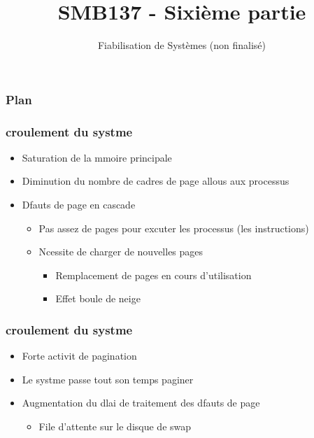 

\title{SMB137 - Sixième partie}
\subtitle{Fiabilisation de Systèmes (non finalisé)}


\frame[plain]{\titlepage}


\begin{frame}
 \frametitle{Plan}
 \tableofcontents
\end{frame} 

\begin{frame}
\frametitle{croulement du systme}
\begin{itemize}
\item Saturation de la mmoire principale
\item Diminution du nombre de cadres de page allous aux processus
\item Dfauts de page en cascade
\begin{itemize}
\item Pas assez de pages pour excuter les processus (les instructions)
\item Ncessite de charger de nouvelles pages
\begin{itemize}
\item Remplacement de pages en cours d'utilisation
\item Effet boule de neige
\end{itemize}
\end{itemize}
\end{itemize}
\end{frame}

\begin{frame}
\frametitle{croulement du systme}
\begin{itemize}
\item Forte activit de pagination
\item Le systme passe tout son temps  paginer
\item Augmentation du dlai de traitement des dfauts de page
\begin{itemize}
\item File d'attente sur le disque de swap
\end{itemize}
\end{itemize}
\end{frame}


